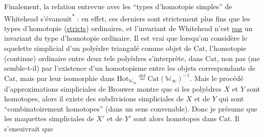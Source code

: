  Finalement, la relation entrevue avec les ``types d'homotopie simples'' de Whitehead s'évanouit\textsuperscript{*} : en effet, ces derniers sont strictement
 plus fins que les types d'homotopie (\uline{stricts}) ordinaires, et l'invariant de Whitehead n'est \uline{pas} un invariant du type d'homotopie ordinaire. Il est vrai que lorsqu'on considère le squelette simplicial d'un polyèdre triangulé comme objet de $\mathrm{Cat}$, l'homotopie (continue) ordinaire entre deux tels polyèdres s'interprète, dans $\mathrm{Cat}$, non pas  (me semble-t-il) par l'existence d'un homotopisme\deleted{\unsure{,}} entre les objets correspondants de $\mathrm{Cat}$, mais par leur isomorphie dans $\mathrm{Hot}_{\mathbb W_\infty}\overset{\mathrm{def}}{=}\mathrm{Cat}(\mathbb W_\infty)^{-1}$. Mais le procédé d'approximations simpliciales de Brouwer montre que si les polyèdres $X$ et $Y$ sont homotopes, alors il existe des subdivisions simpliciales  de $X$ et de $Y$ qui sont ``combinatoirement homotopes'' (dans un sens convenable). Donc  je présume que les maquettes simpliciales de $X'$ et de $Y'$ sont alors homotopes dans $\mathrm{Cat}$. Il s'ensuivrait que

